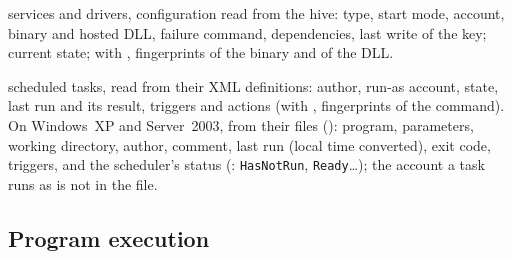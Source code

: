 \documentclass[11pt,a4paper,oneside]{report}
\begin{document}
\begin{description}[style=nextline,leftmargin=1.2em]
  \item[\fichier{services.json}] services and drivers, configuration read from
        the hive: type, start mode, account, binary and hosted DLL, failure
        command, dependencies, last write of the key; current state; with
        , fingerprints of the binary and of the DLL.
  \item[\fichier{ScheduledTasks.json}] scheduled tasks, read from their XML
        definitions: author, run-as account, state, last run and its result,
        triggers and actions (with , fingerprints of the command).
        On Windows~XP and Server~2003, from their  files
        (): program, parameters, working directory, author,
        comment, last run (local time converted), exit code, triggers, and the
        scheduler's status (: \texttt{HasNotRun},
        \texttt{Ready}\ldots); the account a task runs as is not in the file.
\end{description}

\subsection{Program execution}
\end{document}
